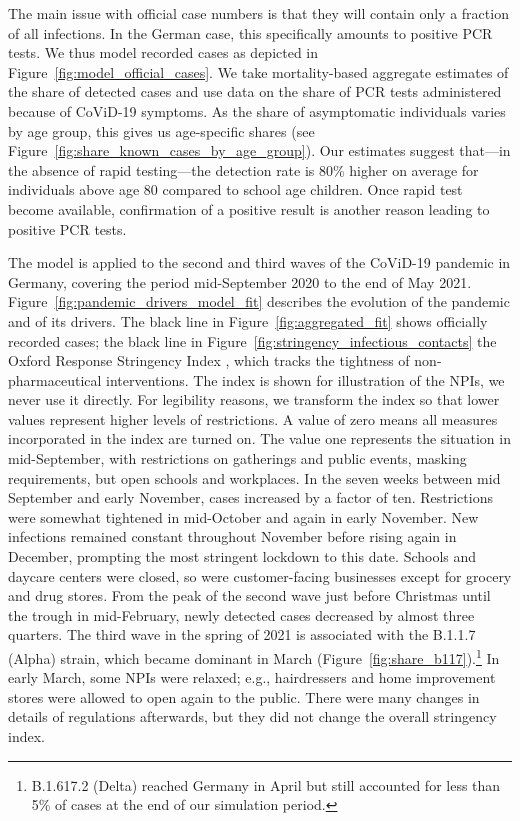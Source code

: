 \documentclass[12pt]{article}
\begin{document}
The main issue with official case numbers is that they will contain only a fraction of
all infections. In the German case, this specifically amounts to positive PCR tests. We
thus model recorded cases as depicted in Figure~\ref{fig:model_official_cases}. We take
mortality-based aggregate estimates of the share of detected cases and use data on the
share of PCR tests administered because of CoViD-19
symptoms. As the share of asymptomatic individuals
varies by age group, this gives us age-specific shares (see
Figure~\ref{fig:share_known_cases_by_age_group}). Our estimates suggest that---in the
absence of rapid testing---the detection rate is 80\% higher on average for individuals
above age 80 compared to school age children. Once rapid test become available,
confirmation of a positive result is another reason leading to positive PCR tests.

The model is applied to the second and third waves of the CoViD-19 pandemic in Germany,
covering the period mid-September 2020 to the end of May 2021.
Figure~\ref{fig:pandemic_drivers_model_fit} describes the evolution of the pandemic and
of its drivers. The black line in Figure~\ref{fig:aggregated_fit} shows officially
recorded cases; the black line in Figure~\ref{fig:stringency_infectious_contacts} the
Oxford Response Stringency Index \cite{Hale2020}, which tracks the tightness of
non-pharmaceutical interventions. The index is shown for illustration of the NPIs, we
never use it directly. For legibility reasons, we transform the index so that lower
values represent higher levels of restrictions. A value of zero means all measures
incorporated in the index are turned on. The value one represents the situation in
mid-September, with restrictions on gatherings and public events, masking requirements,
but open schools and workplaces. In the seven weeks between mid September and early
November, cases increased by a factor of ten. Restrictions were somewhat tightened in
mid-October and again in early November. New infections remained constant throughout
November before rising again in December, prompting the most stringent lockdown to this
date. Schools and daycare centers were closed, so were customer-facing businesses except
for grocery and drug stores. From the peak of the second wave just before Christmas
until the trough in mid-February, newly detected cases decreased by almost three
quarters. The third wave in the spring of 2021 is associated with the B.1.1.7 (Alpha)
strain, which became dominant in March (Figure~\ref{fig:share_b117}).\footnote{B.1.617.2
    (Delta) reached Germany in April but still accounted for less than 5\% of cases at the
    end of our simulation period.} In early March, some NPIs were relaxed; e.g.,
hairdressers and home improvement stores were allowed to open again to the public. There
were many changes in details of regulations afterwards, but they did not change the
overall stringency index.
\end{document}
